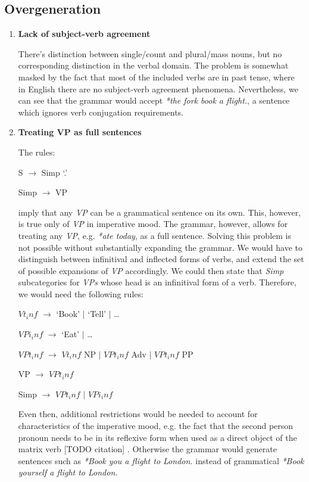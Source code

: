 \documentclass{article}
\begin{document}
	\subsection{Overgeneration}
	\begin{enumerate}
		\item
		\textbf{Lack of subject-verb agreement}
		
		There’s distinction between single/count and plural/mass nouns, but no corresponding distinction in the verbal domain. The problem is somewhat masked by the fact that most of the included verbs are in past tense, where in English there are no subject-verb agreement phenomena. Nevertheless, we can see that the grammar would accept  \emph{*the fork book a flight.}, a sentence which ignores verb conjugation requirements.
		
		\item
		\textbf{Treating VP as full sentences}
		
		The rules:
		\begin{center}
			
			S $\rightarrow$ Simp ‘.’
			
			Simp $\rightarrow$ VP
			
		\end{center}
		imply that any \emph{VP} can be a grammatical sentence on its own. This, however, is true only of \emph{VP} in imperative mood. The grammar, however, allows for treating any \emph{VP}, e.g. \emph{*ate today}, as a full sentence. Solving this problem is not possible without substantially expanding the grammar. We would have to distinguish between infinitival and inflected forms of verbs, and extend the set of possible expansions of \emph{VP} accordingly. We could then state that \emph{Simp} subcategories for \emph{VPs} whose head is an infinitival form of a verb. Therefore, we would need the following rules:
		\begin{center}
			
			$Vt_inf$ $\rightarrow$ ‘Book’ $\vert$ ‘Tell’ $\vert$ …
			
			$VPi_inf$ $\rightarrow$ ‘Eat' $\vert$ …
			
			$VPt_inf$ $\rightarrow$ $Vt_inf$ NP $\vert$ $VPt_inf$ Adv $\vert$ $VPt_inf$ PP
			
			VP $\rightarrow$ $VPt_inf$
			
			Simp $\rightarrow$ $VPt_inf$ $\vert$ $VPi_inf$
			
		\end{center}
		Even then, additional restrictions would be needed to account for characteristics of the imperative mood, e.g. the fact that the second person pronoun needs to be in its reflexive form when used as a direct object of the matrix verb [TODO citation] . Otherwise the grammar would generate sentences such as \emph{*Book you a flight to London.} instead of grammatical \emph{*Book yourself a flight to London.}
		

\end{enumerate}
\end{document}
